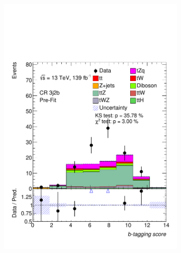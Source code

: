 \begin{figure}
\begin{subfigure}[b]{0.32\linewidth}
    \includegraphics[width=\linewidth]{ubonn-thesis/Chapters/Chapters_06/Figure/Input_distribution/CR_3j2b_btag.pdf} 
  \end{subfigure} 
  \newline
  \centering
  \begin{subfigure}[b]{0.32\linewidth}

\end{subfigure}
\end{figure}
